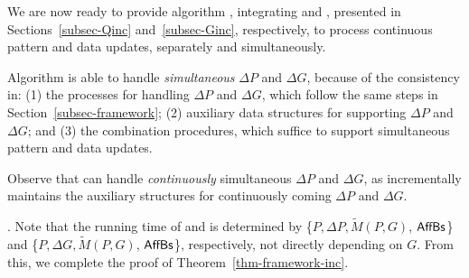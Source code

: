 We are now ready to provide algorithm \inc, integrating \incp and \incd, presented in Sections~\ref{subsec-Qinc} and~\ref{subsec-Ginc}, respectively, to process continuous pattern and data updates, separately and simultaneously.

Algorithm \inc is able to handle {\em simultaneous} $\Delta P$ and $\Delta G$, because of the consistency in:
(1) the processes for handling $\Delta P$ and $\Delta G$, which follow the same steps in Section~\ref{subsec-framework};
(2) auxiliary data structures for supporting $\Delta P$ and $\Delta G$; and
(3) the combination procedures, which suffice to support simultaneous pattern and data updates.

Observe that \inc can handle {\em continuously} simultaneous $\Delta P$ and $\Delta G$,
as \inc incrementally maintains the auxiliary structures for continuously coming $\Delta P$ and $\Delta G$.




. Note that the running time of \incp and \incd is determined by \{$P, \Delta P, \tilde{M}(P,G)$, ${\mathsf{AffBs}}$\}
and \{$P, \Delta G, \tilde{M}(P,G)$, ${\mathsf{AffBs}}$\}, respectively, not directly depending on $G$.
From this, we complete the proof of Theorem~\ref{thm-framework-inc}.
